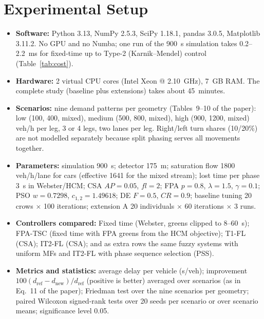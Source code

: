\section{Experimental Setup}
\label{sec:setup}
\begin{itemize}\setlength\itemsep{0pt}
\item \textbf{Software:} Python 3.13, NumPy 2.5.3, SciPy 1.18.1, pandas 3.0.5, Matplotlib 3.11.2. No GPU and no Numba; one run of the 900~s simulation takes 0.2--2.2~ms for fixed-time up to Type-2 (Karnik--Mendel) control (Table~\ref{tab:cost}).
\item \textbf{Hardware:} 2 virtual CPU cores (Intel Xeon @ 2.10~GHz), 7~GB RAM. The complete study (baseline plus extensions) takes about 45~minutes.
\item \textbf{Scenarios:} nine demand patterns per geometry (Tables~9--10 of the paper): low (100, 400, mixed), medium (500, 800, mixed), high (900, 1200, mixed) veh/h per leg, 3 or 4 legs, two lanes per leg. Right/left turn shares (10/20\%) are not modelled separately because split phasing serves all movements together.
\item \textbf{Parameters:} simulation 900~s; detector 175~m; saturation flow 1800 veh/h/lane for cars (effective 1641 for the mixed stream); lost time per phase 3~s in Webster/HCM; CSA $AP=0.05$, $fl=2$; FPA $p=0.8$, $\lambda=1.5$, $\gamma=0.1$; PSO $w=0.7298$, $c_{1,2}=1.49618$; DE $F=0.5$, $CR=0.9$; baseline tuning 20 crows $\times$ 100 iterations; extension A 20 individuals $\times$ 60 iterations $\times$ 3 runs.
\item \textbf{Controllers compared:} Fixed time (Webster, greens clipped to 8--60~s); FPA-TSC (fixed time with FPA greens from the HCM objective); T1-FL (CSA); IT2-FL (CSA); and as extra rows the same fuzzy systems with uniform MFs and IT2-FL with phase sequence selection (PSS).
\item \textbf{Metrics and statistics:} average delay per vehicle (s/veh); improvement $100(d_\text{ref}-d_\text{new})/d_\text{ref}$ (positive is better) averaged over scenarios (as in Eq.~11 of the paper); Friedman test over the nine scenarios per geometry; paired Wilcoxon signed-rank tests over 20 seeds per scenario or over scenario means; significance level 0.05.
\end{itemize}
